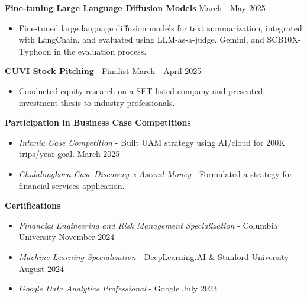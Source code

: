 \documentclass[a4paper, 11pt]{article}
\begin{document}
\href{https://github.com/pupipatsk/NanoLLaDA.git}{\textbf{Fine-tuning Large Language Diffusion Models}} \hfill March - May 2025
\begin{itemize}[noitemsep, topsep=0pt, partopsep=0pt, parsep=0pt, leftmargin=20pt]
    \item Fine-tuned large language diffusion models for text summarization, integrated with LangChain, and evaluated using LLM-as-a-judge, Gemini, and SCB10X-Typhoon in the evaluation process.
\end{itemize}
\vspace{3pt}

\textbf{CUVI Stock Pitching} | Finalist \hfill March - April 2025
\begin{itemize}[noitemsep, topsep=0pt, partopsep=0pt, parsep=0pt, leftmargin=20pt]
    \item Conducted equity research on a SET-listed company and presented investment thesis to industry professionals.
\end{itemize}
\vspace{3pt}

\textbf{Participation in Business Case Competitions}
\begin{itemize}[noitemsep, topsep=0pt, partopsep=0pt, parsep=0pt, leftmargin=20pt]
    \item \textit{Intania Case Competition} - Built UAM strategy using AI/cloud for 200K trips/year goal. \hfill March 2025
    \item \textit{Chulalongkorn Case Discovery x Ascend Money} - Formulated a strategy for financial services application.
\end{itemize}
\vspace{3pt}

\textbf{Certifications}
\begin{itemize}[noitemsep, topsep=0pt, partopsep=0pt, parsep=0pt, leftmargin=20pt]
    \item \textit{Financial Engineering and Risk Management Specialization} - Columbia University \hfill November 2024
    \item \textit{Machine Learning Specialization} - DeepLearning.AI \& Stanford University \hfill August 2024
    \item \textit{Google Data Analytics Professional} - Google \hfill July 2023
\end{itemize}
\end{document}
